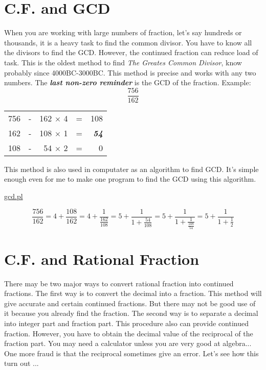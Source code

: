 \documentclass{jreport}
\begin{document}
\section*{C.F. and GCD}
When you are working with large numbers of fraction, let's say hundreds or thousands, it is a heavy task to find the common divisor. You have to know all the divisors to find the GCD. However, the continued fraction can reduce load of task. This is the oldest method to find \textit{The Greates Common Divisor}, know probably since 4000BC-3000BC. This method is precise and works with any two numbers. The \textbf{\textit{last non-zero reminder}} is the GCD of the fraction. Example:
\[\frac{756}{162}\]
\begin{table}[htbp]
\begin{center}
\begin{tabular}{|rrrrr|}
\hline
756 & - & 162 $\times$ 4 & = & 108\\
162 & - & 108 $\times$ 1 & = & \textbf{\textit{54}}\\
108 & - & 54 $\times$ 2 & = & 0\\
\hline
\end{tabular}
\end{center}
\end{table}

This method is also used in computater as an algorithm to find GCD. It's simple enough even for me to make one program to find the GCD using this algorithm.
\begin{flushright}
\underline{gcd.pl}
\end{flushright}
\[\frac{756}{162}=4+\frac{108}{162}=4+\frac{1}{\frac{162}{108}}=5+\frac{1}{1+\frac{54}{108}}=5+\frac{1}{1+\frac{1}{\frac{108}{54}}}=5+\frac{1}{1+\frac{1}{2}}\]

\section*{C.F. and Rational Fraction}
There may be two major ways to convert rational fraction into continued fractions. The first way is to convert the decimal into a fraction. This method will give accurate and certain continued fractions. But there may not be good use of it because you already find the fraction. The second way is to separate a decimal into integer part and fraction part. This procedure also can provide continued fraction. However, you have to obtain the decimal value of the reciprocal of the fraction part. You may need a calculator unless you are very good at algebra... One more fraud is that the reciprocal sometimes give an error. Let's see how this turn out ...
\end{document}
